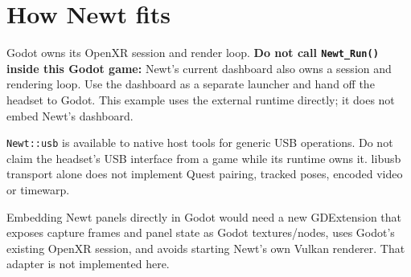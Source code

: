 \documentclass[11pt]{article}
\begin{document}
\section{How Newt fits}
\label{sec:org878d55f}
Godot owns its OpenXR session and render loop. \textbf{Do not call \texttt{Newt\_Run()} inside this Godot game:} Newt's current dashboard also owns a session and rendering loop. Use the dashboard as a separate launcher and hand off the headset to Godot. This example uses the external runtime directly; it does not embed Newt's dashboard.

\texttt{Newt::usb} is available to native host tools for generic USB operations. Do not claim the headset's USB interface from a game while its runtime owns it. libusb transport alone does not implement Quest pairing, tracked poses, encoded video or timewarp.

Embedding Newt panels directly in Godot would need a new GDExtension that exposes capture frames and panel state as Godot textures/nodes, uses Godot's existing OpenXR session, and avoids starting Newt's own Vulkan renderer. That adapter is not implemented here.
\end{document}
